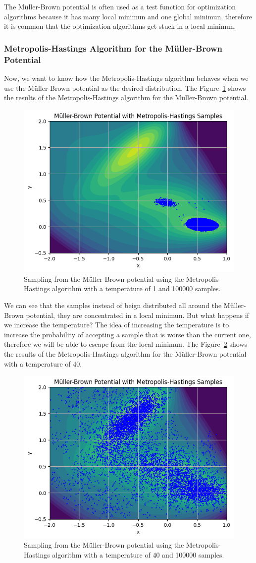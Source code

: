 \documentclass{report}
\begin{document}
The Müller-Brown potential is often used as a test function for optimization algorithms because it has many local minimun and one global minimun, therefore it is common that the optimization algorithms get stuck in a local minimun.

\subsubsection{Metropolis-Hastings Algorithm for the Müller-Brown Potential}
\label{sec:metropolis_muller_brown}

Now, we want to know how the Metropolis-Hastings algorithm behaves when we use the Müller-Brown potential as the desired distribution. The Figure~\ref{fig:mullerbrownmh} shows the results of the Metropolis-Hastings algorithm for the Müller-Brown potential.

\begin{figure}[H]
	\centering
	\includegraphics[width=0.5\linewidth]{./Figures/MCMC/mullerbrownmh.png}
	\caption{Sampling from the Müller-Brown potential using the Metropolis-Hastings algorithm with a temperature of 1 and 100000 samples.}
	\label{fig:mullerbrownmh}
\end{figure}

We can see that the samples instead of beign distributed all around the Müller-Brown potential, they are concentrated in a local minimun. But what happens if we increase the temperature? The idea of increasing the temperature is to increase the probability of accepting a sample that is worse than the current one, therefore we will be able to escape from the local minimun. The Figure~\ref{fig:mullerbrownmh2} shows the results of the Metropolis-Hastings algorithm for the Müller-Brown potential with a temperature of 40.

\begin{figure}[H]
	\centering
	\includegraphics[width=0.5\linewidth]{./Figures/MCMC/mullerbrownmh2.png}
	\caption{Sampling from the Müller-Brown potential using the Metropolis-Hastings algorithm with a temperature of 40 and 100000 samples.}
	\label{fig:mullerbrownmh2}
\end{figure}
\end{document}
